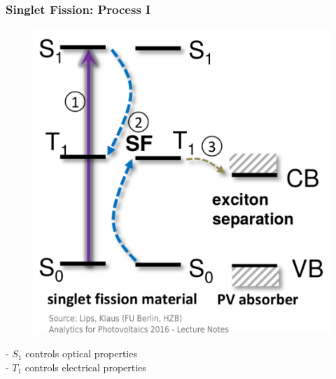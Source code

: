 \documentclass[compress]{beamer}
\begin{document}
\begin{frame}
  \frametitle{Singlet Fission: Process I}
\begin{multicols}{2}
\vspace{-10pt}
\begin{figure}[H]
\includegraphics[width=1.1\columnwidth]{../img/SF_esq11.pdf}
\end{figure}
\small
\hspace{-15pt}- $S_1$ controls optical properties\\
\hspace{-15pt}- $T_1$ controls electrical properties\\


\end{multicols}
\end{frame}
\end{document}
